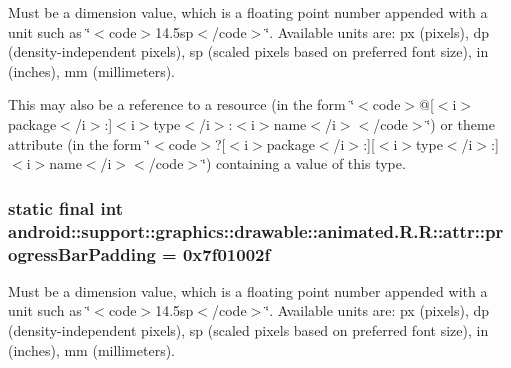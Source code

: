 Must be a dimension value, which is a floating point number appended with a unit such as \char`\"{}$<$code$>$14.5sp$<$/code$>$\char`\"{}. Available units are: px (pixels), dp (density-independent pixels), sp (scaled pixels based on preferred font size), in (inches), mm (millimeters). 

This may also be a reference to a resource (in the form \char`\"{}$<$code$>$@\mbox{[}$<$i$>$package$<$/i$>$:\mbox{]}$<$i$>$type$<$/i$>$:$<$i$>$name$<$/i$>$$<$/code$>$\char`\"{}) or theme attribute (in the form \char`\"{}$<$code$>$?\mbox{[}$<$i$>$package$<$/i$>$:\mbox{]}\mbox{[}$<$i$>$type$<$/i$>$:\mbox{]}$<$i$>$name$<$/i$>$$<$/code$>$\char`\"{}) containing a value of this type. \hypertarget{classandroid_1_1support_1_1graphics_1_1drawable_1_1animated_1_1_r_1_1attr_23159ba2afe9eb2ea58892fa0e6c3979}{
\subsubsection[{progressBarPadding}]{\setlength{\rightskip}{0pt plus 5cm}static final int android::support::graphics::drawable::animated.R.R::attr::progressBarPadding = 0x7f01002f}}
\label{classandroid_1_1support_1_1graphics_1_1drawable_1_1animated_1_1_r_1_1attr_23159ba2afe9eb2ea58892fa0e6c3979}


Must be a dimension value, which is a floating point number appended with a unit such as \char`\"{}$<$code$>$14.5sp$<$/code$>$\char`\"{}. Available units are: px (pixels), dp (density-independent pixels), sp (scaled pixels based on preferred font size), in (inches), mm (millimeters). 

